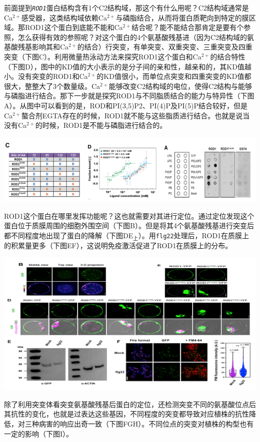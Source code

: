\documentclass[
  10pt,
]{book}
\begin{document}
前面提到\emph{\texttt{ROD1}}蛋白结构含有1个C2结构域，那这个有什么用呢？C2结构域通常是Ca\(^{2+}\)感受器，这类结构域依赖Ca\(^{2+}\)与磷脂结合，从而将蛋白质靶向到特定的膜区域。那ROD1这个蛋白到底能不能和Ca\(^{2+}\)结合呢？能不能结合那肯定是要有个参照，怎么获得有效的参照呢？对这个蛋白的4个氨基酸残基进（因为C2结构域的氨基酸残基影响其和Ca\(^{2+}\)的结合）行突变，有单突变、双重突变、三重突变及四重突变（下图C）。利用微量热泳动方法来探究ROD1这个蛋白和Ca\(^{2+}\)的结合特性（下图D），图中的KD值的大小表示的是分子间的亲和性，越亲和的，其KD值越小。没有突变的ROD1和Ca\(^{2+}\)的KD值很小，而单位点突变和四重突变的KD值都很大，整整大了3个数量级。Ca\(^{2+}\)能够改变C2结构域的电位，使得C2结构与能够与磷脂进行结合。那下一步就是探究ROD1与不同脂质结合的能力与特异性（下图A）。从图中可以看到的是，ROD和PI(3,5)P2、PI(4)P及PI(5)P结合较好，但是Ca\(^{2+}\)螯合剂EGTA存在的时候，ROD1就不能与这些脂质进行结合。也就是说当没有Ca\(^{2+}\)的时候，ROD1是不能与磷脂进行结合的。

\includegraphics{figures/HeZuhuaCell2021/7.png}

ROD1这个蛋白在哪里发挥功能呢？这也就需要对其进行定位。通过定位发现这个蛋白位于质膜周围的细胞外围空间（下图B）。但是将其4个氨基酸残基进行突变后都不同程度地出现了蛋白的降解（下图DE\(_上\)）。用\texttt{flg22}处理后，ROD1在质膜上的积累量更多（下图EF），这说明免疫激活促进了ROD1在质膜上的分布。

\includegraphics{figures/HeZuhuaCell2021/8.png}

除了利用突变体看突变氨基酸残基后蛋白的定位，还检测突变不同的氨基酸位点后其抗性的变化，也就是过表达这些基因，不同程度的突变都导致对应植株的抗性降低，对三种病害的响应出奇一致（下图FGH）。不同位点的突变对植株的构型也有一定的影响（下图I）。
\end{document}
